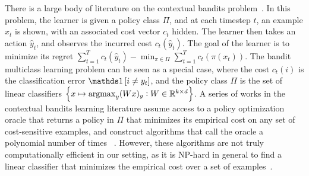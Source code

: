 

There is a large body of literature on the contextual bandits
problem~\citep{Auer-2003, Langford-Zhang-2008}. In this problem, the learner is
given a policy class $\Pi$, and at each timestep $t$, an example $x_t$ is shown,
with an associated cost vector $c_t$ hidden. The learner then takes an action
$\widehat{y}_t$, and observes the incurred cost $c_t(\widehat{y}_t)$. The goal
of the learner is to minimize its regret $\sum_{t=1}^T c_t(\widehat{y}_t) -
\min_{\pi \in \Pi} \sum_{t=1}^T c_t(\pi(x_t))$.
The bandit multiclass
learning problem can be seen as a special case,
where the
cost $c_t(i)$ is the classification error $\indicator{i \neq y_t}$, and the
policy class $\Pi$ is the set of linear classifiers $\cbr{x \mapsto \argmax_y
(Wx)_y: W \in \R^{k \times d}}$. A series of works in the contextual bandits
learning literature
assume access to
a policy optimization oracle that returns a policy in $\Pi$ that minimizes
its empirical cost on any set of cost-sensitive examples, and
construct algorithms that call
the oracle a polynomial number of times%
~\citep{Dudik-Hsu-Kale-Karampatziakis-Langford-Reyzin-Zhang-2011,
Agarwal-Hsu-Kale-Langford-Li-Schapire-2014, Rakhlin-Sridharan-2016,
Syrgkanis-Krishnamurthy-Schapire-2016,
Syrgkanis-Luo-Krishnamurthy-Schapire-2016}.
However, these algorithms are not
truly computationally efficient in our setting, as it is NP-hard in general to
find a linear classifier that minimizes the empirical cost over a set of
examples~\citep{Arora-Babai-Stern-Sweedyk-1997}.


